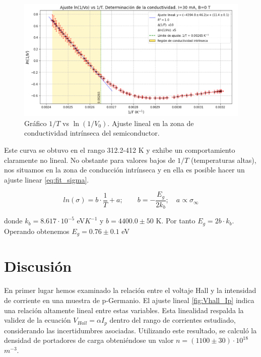 	\begin{figure}[H]
		\centering
		\begin{minipage}{0.7\textwidth} 
			\includegraphics[width=\textwidth]{grafico_1x03_conductividad_intrinseca.png}
			\caption{\footnotesize Gráfico $1/T$ vs $\ln(1/V_0)$. Ajuste lineal en la zona de conductividad intrínseca del semiconductor.}
			\label{fig:sigma_intr}
		\end{minipage}
	\end{figure}
	
	Este curva se obtuvo en el rango 312.2-412 K y exhibe un comportamiento claramente no lineal. No obstante  para valores bajos de  $1/T$ (temperaturas altas), nos situamos en la zona de conducción intrínseca y en ella es posible hacer un ajuste linear \ref{eq:fit_sigma}.
	
	
	\begin{equation} \label{eq:fit_sigma}
		ln(\sigma) = b\cdot \frac{1}{T} + a; \qquad b = -\frac{E_g}{2k_b};\quad a \propto \sigma_{\infty}
	\end{equation}
	
	\vspace{\baselineskip}
	
	donde $k_b = 8.617\cdot 10^{-5}$ eV$K^{-1}$ y $b = 4400.0\pm50$ K. Por tanto $E_g = 2b\cdot k_b$. Operando obtenemos $E_g = 0.76\pm0.1$ eV
	
	\section{Discusión}
	
	En primer lugar hemos examinado la relación entre el voltaje Hall y la intensidad de corriente en una muestra de p-Germanio. El ajuste lineal \ref{fig:Vhall_Ip} indica una relación altamente lineal entre estas variables. Esta linealidad respalda la validez de la ecuación $V_{Hall} = \alpha I_p$ dentro del rango de corrientes estudiado, considerando las incertidumbres asociadas. Utilizando este resultado, se calculó la densidad de portadores de carga obteniéndose un valor $n=(1100\pm30)\cdot 10^{18}$ $m^{-3}$.
	
